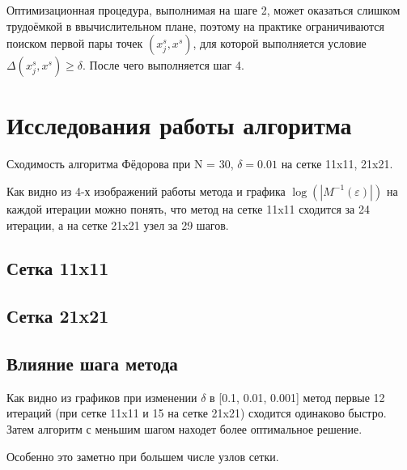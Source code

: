 Оптимизационная процедура, выполнимая на шаге 2, может оказаться слишком трудоёмкой 
в ввычислительном плане, поэтому на практике ограничиваются поиском первой пары точек
$ \left( x_j^s, x^s \right) $, для которой выполняется условие 
$ \Delta \left( x_j^s, x^s \right) \geq \delta $. После чего выполняется шаг 4.



\section{Исследования работы алгоритма}

Сходимость алгоритма Фёдорова при N = 30, $\delta = 0.01$ на сетке 11x11, 21x21.

Как видно из 4-х изображений работы метода и графика $\log(\left| M^{-1}(\varepsilon) \right|) $
на каждой итерации можно понять, что метод на сетке 11x11 сходится за 24 итерации, а на сетке 
21x21 узел за 29 шагов.


\subsection{Сетка 11x11}
\vspace{30mm}


\subsection{Сетка 21x21}



\subsection{Влияние шага метода}

Как видно из графиков при изменении $\delta$ в [0.1, 0.01, 0.001] метод первые 12
итераций (при сетке 11x11 и 15 на сетке 21x21) сходится одинаково быстро. Затем алгоритм с меньшим шагом находет более
оптимальное решение.

Особенно это заметно при большем числе узлов сетки.



